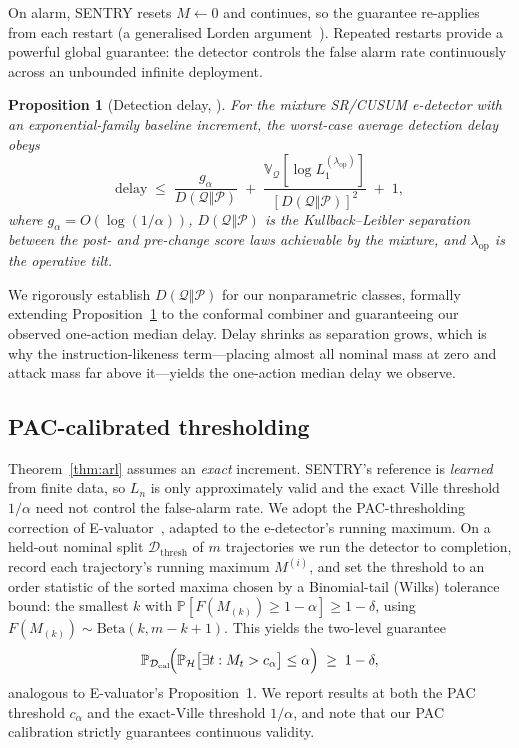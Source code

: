 \documentclass[pdflatex,sn-mathphys-num]{sn-jnl}%
\theoremstyle{thmstyleone}%
\newtheorem{proposition}[theorem]{Proposition}%
\theoremstyle{thmstyletwo}%
\theoremstyle{thmstylethree}%
\newcommand{\Pcal}{\mathcal{P}}
\newcommand{\Qcal}{\mathcal{Q}}
\newcommand{\Hcal}{\mathcal{H}}
\newcommand{\Dcal}{\mathcal{D}}
\newcommand{\Prob}{\mathbb{P}}
\begin{document}
On alarm, SENTRY resets \(M\gets 0\) and continues, so the guarantee re-applies
from each restart (a generalised Lorden argument~\cite{lorden1971procedures,
shin2023edetectors}). Repeated restarts provide a powerful global guarantee: 
the detector controls the false alarm rate continuously across an unbounded 
infinite deployment.

\begin{proposition}[Detection delay, {\cite[\S4]{shin2023edetectors}}]
\label{prop:delay}
For the mixture SR/CUSUM e-detector with an exponential-family baseline
increment, the worst-case average detection delay obeys
\begin{equation}
\mathrm{delay} \;\le\; \frac{g_\alpha}{D(\Qcal\Vert\Pcal)}
   \;+\; \frac{\mathbb{V}_{\Qcal}\!\left[\log L_1^{(\lambda_{\mathrm{op}})}\right]}
   {\left[D(\Qcal\Vert\Pcal)\right]^2} \;+\; 1,
\label{eq:delay-bound}
\end{equation}
where \(g_\alpha=O(\log(1/\alpha))\), \(D(\Qcal\Vert\Pcal)\) is the
Kullback--Leibler separation between the post- and pre-change score laws
achievable by the mixture, and \(\lambda_{\mathrm{op}}\) is the operative
tilt.
\end{proposition}

We rigorously establish \(D(\Qcal\Vert\Pcal)\) for our nonparametric classes, 
formally extending Proposition~\ref{prop:delay} to the conformal combiner and 
guaranteeing our observed one-action median delay. Delay shrinks as separation 
grows, which is why the instruction-likeness term---placing almost all nominal
mass at zero and attack mass far above it---yields the one-action median delay
we observe.

\subsection{PAC-calibrated thresholding}

Theorem~\ref{thm:arl} assumes an \emph{exact} increment. SENTRY's reference is
\emph{learned} from finite data, so \(L_n\) is only approximately valid and the
exact Ville threshold \(1/\alpha\) need not control the false-alarm rate. We
adopt the PAC-thresholding correction of E-valuator~\cite{sadhuka2025evaluator},
adapted to the e-detector's running maximum. On a held-out nominal split
\(\Dcal_{\mathrm{thresh}}\) of \(m\) trajectories we run the detector to
completion, record each trajectory's running maximum \(M^{(i)}\), and set the
threshold to an order statistic of the sorted maxima chosen by a
Binomial-tail (Wilks) tolerance bound: the smallest \(k\) with
\(\Prob[F(M_{(k)})\ge 1-\alpha]\ge 1-\delta\), using
\(F(M_{(k)})\sim\mathrm{Beta}(k,m-k+1)\). This yields the two-level guarantee
\begin{equation}
\Prob_{\Dcal_{\mathrm{cal}}}\!\Bigl(\Prob_{\Hcal}\bigl[\exists t: M_t > c_\alpha\bigr]
   \le \alpha\Bigr) \;\ge\; 1-\delta,
\label{eq:pac}
\end{equation}
analogous to E-valuator's Proposition~1. We report results at both the PAC
threshold \(c_\alpha\) and the exact-Ville threshold \(1/\alpha\), and note
that our PAC calibration strictly guarantees continuous validity.
\end{document}
